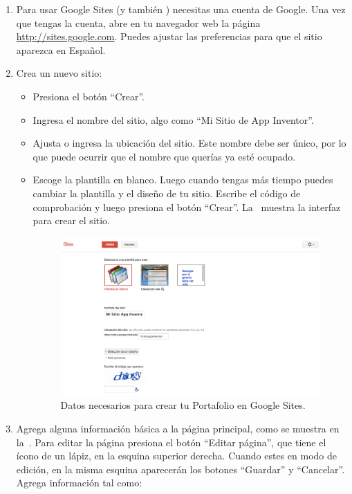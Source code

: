 \documentclass[letterpaper]{article}
\begin{document}
\begin{enumerate}

\item Para usar Google Sites (y también \AppInventor) necesitas una
  cuenta de Google. Una vez que tengas la cuenta, abre en tu navegador
  web la página \url{http://sites.google.com}. Puedes ajustar las
  preferencias para que el sitio aparezca en Español.

\item Crea un nuevo sitio:

  \begin{itemize}
  \item Presiona el botón ``Crear''.
  \item Ingresa el nombre del sitio, algo como ``Mi Sitio de App
    Inventor''.
  \item Ajusta o ingresa la ubicación del sitio. Este nombre debe ser
    único, por lo que puede ocurrir que el nombre que querías ya esté
    ocupado. 
  \item Escoge la plantilla en blanco. Luego cuando tengas más tiempo
    puedes cambiar la plantilla y el diseño de tu sitio. Escribe el
    código de comprobación y luego presiona el botón
    ``Crear''. La~ muestra la interfaz para crear
    el sitio.

\begin{figure}[H]
\centering
\includegraphics[scale=0.25]{figures/CreateSite}
\caption{Datos necesarios para crear tu Portafolio en Google Sites.}
\label{fig:createSite}
\end{figure}
    
  \end{itemize}

\item Agrega alguna información básica a la página principal, como se
  muestra en la~. Para editar la página presiona
  el botón ``Editar página'', que tiene el ícono de un lápiz, en la
  esquina superior derecha. Cuando estes en modo de edición, en la
  misma esquina aparecerán los botones ``Guardar'' y
  ``Cancelar''. Agrega información tal como:


\end{enumerate}
\end{document}
